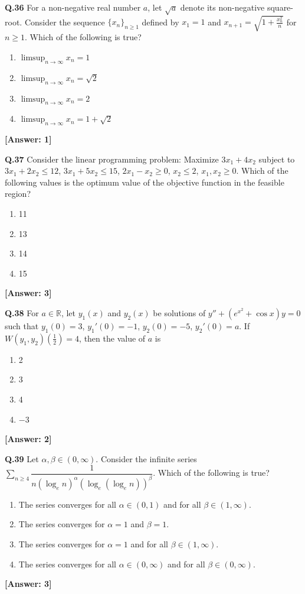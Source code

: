 \documentclass[12pt,a4paper]{article}
\newcommand{\ans}[1]{\quad\textcolor{anscolor}{\textbf{[Answer: #1]}}}
\begin{document}
\textbf{Q.36} For a non-negative real number $a$, let $\sqrt{a}$ denote its non-negative square-root. Consider the sequence $\{x_n\}_{n\ge1}$ defined by $x_1=1$ and $x_{n+1}=\sqrt{1+\frac{x_n^2}{n}}$ for $n\ge1$. Which of the following is true?
\begin{enumerate}[label=\arabic*.]
\item $\limsup_{n\to\infty}x_n=1$ \item $\limsup_{n\to\infty}x_n=\sqrt{2}$
\item $\limsup_{n\to\infty}x_n=2$ \item $\limsup_{n\to\infty}x_n=1+\sqrt{2}$
\end{enumerate}\ans{1}

\textbf{Q.37} Consider the linear programming problem: Maximize $3x_1+4x_2$ subject to $3x_1+2x_2\le12$, $3x_1+5x_2\le15$, $2x_1-x_2\ge0$, $x_2\le2$, $x_1,x_2\ge0$. Which of the following values is the optimum value of the objective function in the feasible region?
\begin{enumerate}[label=\arabic*.]
\item 11 \item 13 \item 14 \item 15
\end{enumerate}\ans{3}

\textbf{Q.38} For $a\in\mathbb{R}$, let $y_1(x)$ and $y_2(x)$ be solutions of $y''+(e^{x^2}+\cos x)y=0$ such that $y_1(0)=3$, $y_1'(0)=-1$, $y_2(0)=-5$, $y_2'(0)=a$. If $W(y_1,y_2)(\tfrac{1}{2})=4$, then the value of $a$ is
\begin{enumerate}[label=\arabic*.]
\item 2 \item 3 \item 4 \item $-3$
\end{enumerate}\ans{2}

\textbf{Q.39} Let $\alpha,\beta\in(0,\infty)$. Consider the infinite series $\displaystyle\sum_{n\ge4}\dfrac{1}{n(\log_e n)^\alpha(\log_e(\log_e n))^\beta}$. Which of the following is true?
\begin{enumerate}[label=\arabic*.]
\item The series converges for all $\alpha\in(0,1)$ and for all $\beta\in(1,\infty)$.
\item The series converges for $\alpha=1$ and $\beta=1$.
\item The series converges for $\alpha=1$ and for all $\beta\in(1,\infty)$.
\item The series converges for all $\alpha\in(0,\infty)$ and for all $\beta\in(0,\infty)$.
\end{enumerate}\ans{3}
\end{document}
